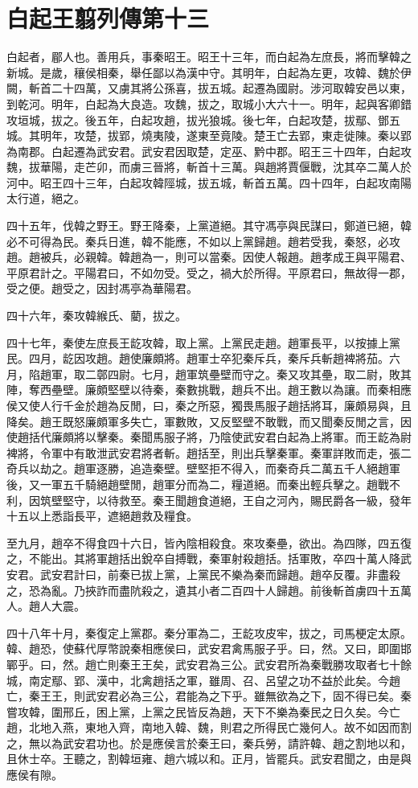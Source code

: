 \chapter{白起王翦列傳第十三}

白起者，郿人也。善用兵，事秦昭王。昭王十三年，而白起為左庶長，將而擊韓之新城。是歲，穰侯相秦，舉任鄙以為漢中守。其明年，白起為左更，攻韓、魏於伊闕，斬首二十四萬，又虜其將公孫喜，拔五城。起遷為國尉。涉河取韓安邑以東，到乾河。明年，白起為大良造。攻魏，拔之，取城小大六十一。明年，起與客卿錯攻垣城，拔之。後五年，白起攻趙，拔光狼城。後七年，白起攻楚，拔鄢、鄧五城。其明年，攻楚，拔郢，燒夷陵，遂東至竟陵。楚王亡去郢，東走徙陳。秦以郢為南郡。白起遷為武安君。武安君因取楚，定巫、黔中郡。昭王三十四年，白起攻魏，拔華陽，走芒卯，而虜三晉將，斬首十三萬。與趙將賈偃戰，沈其卒二萬人於河中。昭王四十三年，白起攻韓陘城，拔五城，斬首五萬。四十四年，白起攻南陽太行道，絕之。

四十五年，伐韓之野王。野王降秦，上黨道絕。其守馮亭與民謀曰，鄭道已絕，韓必不可得為民。秦兵日進，韓不能應，不如以上黨歸趙。趙若受我，秦怒，必攻趙。趙被兵，必親韓。韓趙為一，則可以當秦。因使人報趙。趙孝成王與平陽君、平原君計之。平陽君曰，不如勿受。受之，禍大於所得。平原君曰，無故得一郡，受之便。趙受之，因封馮亭為華陽君。

四十六年，秦攻韓緱氏、藺，拔之。

四十七年，秦使左庶長王龁攻韓，取上黨。上黨民走趙。趙軍長平，以按據上黨民。四月，龁因攻趙。趙使廉頗將。趙軍士卒犯秦斥兵，秦斥兵斬趙裨將茄。六月，陷趙軍，取二鄣四尉。七月，趙軍筑壘壁而守之。秦又攻其壘，取二尉，敗其陣，奪西壘壁。廉頗堅壁以待秦，秦數挑戰，趙兵不出。趙王數以為讓。而秦相應侯又使人行千金於趙為反閒，曰，秦之所惡，獨畏馬服子趙括將耳，廉頗易與，且降矣。趙王既怒廉頗軍多失亡，軍數敗，又反堅壁不敢戰，而又聞秦反閒之言，因使趙括代廉頗將以擊秦。秦聞馬服子將，乃陰使武安君白起為上將軍。而王龁為尉裨將，令軍中有敢泄武安君將者斬。趙括至，則出兵擊秦軍。秦軍詳敗而走，張二奇兵以劫之。趙軍逐勝，追造秦壁。壁堅拒不得入，而秦奇兵二萬五千人絕趙軍後，又一軍五千騎絕趙壁閒，趙軍分而為二，糧道絕。而秦出輕兵擊之。趙戰不利，因筑壁堅守，以待救至。秦王聞趙食道絕，王自之河內，賜民爵各一級，發年十五以上悉詣長平，遮絕趙救及糧食。

至九月，趙卒不得食四十六日，皆內陰相殺食。來攻秦壘，欲出。為四隊，四五復之，不能出。其將軍趙括出銳卒自搏戰，秦軍射殺趙括。括軍敗，卒四十萬人降武安君。武安君計曰，前秦已拔上黨，上黨民不樂為秦而歸趙。趙卒反覆。非盡殺之，恐為亂。乃挾詐而盡阬殺之，遺其小者二百四十人歸趙。前後斬首虜四十五萬人。趙人大震。

四十八年十月，秦復定上黨郡。秦分軍為二，王龁攻皮牢，拔之，司馬梗定太原。韓、趙恐，使蘇代厚幣說秦相應侯曰，武安君禽馬服子乎。曰，然。又曰，即圍邯鄲乎。曰，然。趙亡則秦王王矣，武安君為三公。武安君所為秦戰勝攻取者七十餘城，南定鄢、郢、漢中，北禽趙括之軍，雖周、召、呂望之功不益於此矣。今趙亡，秦王王，則武安君必為三公，君能為之下乎。雖無欲為之下，固不得已矣。秦嘗攻韓，圍邢丘，困上黨，上黨之民皆反為趙，天下不樂為秦民之日久矣。今亡趙，北地入燕，東地入齊，南地入韓、魏，則君之所得民亡幾何人。故不如因而割之，無以為武安君功也。於是應侯言於秦王曰，秦兵勞，請許韓、趙之割地以和，且休士卒。王聽之，割韓垣雍、趙六城以和。正月，皆罷兵。武安君聞之，由是與應侯有隙。

